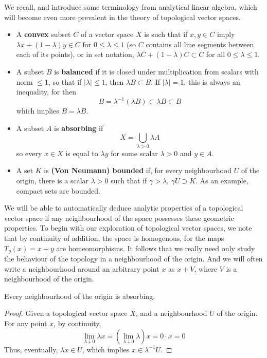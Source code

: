 We recall, and introduce some terminology from analytical linear algebra, which will become even more prevalent in the theory of topological vector spaces.
%
\begin{itemize}
    \item A {\bf convex} subset $C$ of a vector space $X$ is such that if $x, y \in C$ imply $\lambda x + (1 - \lambda) y \in C$ for $0 \leq \lambda \leq 1$ (so $C$ contains all line segments between each of its points), or in set notation, $\lambda C + (1 - \lambda) C \subset C$ for all $0 \leq \lambda \leq 1$.

    \item A subset $B$ is {\bf balanced} if it is closed under multiplication from scalars with norm $\leq 1$, so that if $|\lambda| \leq 1$, then $\lambda B \subset B$. If $|\lambda| = 1$, this is always an inequality, for then
    \[ B = \lambda^{-1}(\lambda B) \subset \lambda B \subset B \]
    which implies $B = \lambda B$.

    \item A subset $A$ is {\bf absorbing} if
    \[ X = \bigcup_{\lambda > 0} \lambda A \]
    so every $x \in X$ is equal to $\lambda y$ for some scalar $\lambda > 0$ and $y \in A$.

    \item A set $K$ is {\bf (Von Neumann) bounded} if, for every neighbourhood $U$ of the origin, there is a scalar $\lambda > 0$ such that if $\gamma > \lambda$, $\gamma U \supset K$. As an example, compact sets are bounded.
\end{itemize}
%
We will be able to automatically deduce analytic properties of a topological vector space if any neighbourhood of the space possesses these geometric properties. To begin with our exploration of topological vector spaces, we note that by continuity of addition, the space is homogenous, for the maps $T_y(x) = x + y$ are homeomorphisms. It follows that we really need only study the behaviour of the topology in a neighbourhood of the origin. And we will often write a neighbourhood around an arbitrary point $x$ as $x + V$, where $V$ is a neighbourhood of the origin.

\begin{theorem}
    Every neighbourhood of the origin is absorbing.
\end{theorem}
\begin{proof}
    Given a topological vector space $X$, and a neighbourhood $U$ of the origin. For any point $x$, by continuity,
    \[ \lim_{\lambda \downarrow 0} \lambda x = \left( \lim_{\lambda \downarrow 0} \lambda \right) x = 0 \cdot x = 0 \]
    Thus, eventually, $\lambda x \in U$, which implies $x \in \lambda^{-1} U$.
\end{proof}

